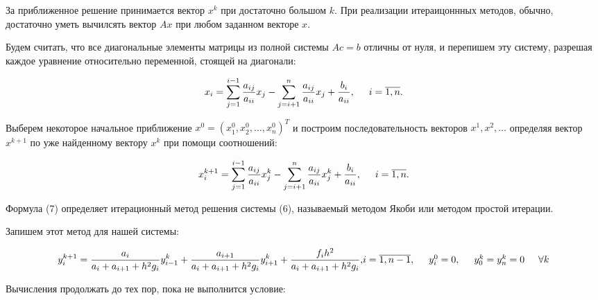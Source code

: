 \documentclass[a4paper,12pt]{article}
\begin{document}
\hspace{0.5cm} За приближенное решение принимается вектор $x^k$ при достаточно большом $k$. При реализации итераицоннных методов,
обычно, достаточно уметь вычилсять вектор $Ax$ при любом заданном векторе $x$.

\hspace{0.5cm} Будем считать, что все диагональные элементы матрицы из полной системы $Ac = b$ отличны от нуля, и перепишем
эту систему, разрешая каждое уравнение относительно переменной, стоящей на диагонали:

\begin{equation}
  x_i = \sum\limits_{j=1}^{i-1}\frac{a_{ij}}{a_{ii}} x_j - \sum\limits_{j = i+1}^{n}\frac{a_{ij}}{a_{ii}} x_j + \frac{b_i}{a_{ii}}, \hspace{0.5cm} i = \overline{1, n}.
\end{equation}

\hspace{0.5cm} Выберем некоторое начальное приближение $x^0 = (x^0_1, x^0_2, \dots, x^0_n)^T$ и построим последовательность
векторов $x^1, x^2, \dots$ определяя вектор $x^{k+1}$ по уже найденному вектору $x^k$ при помощи соотношений:

\begin{equation}
  x^{k+1}_i = \sum\limits_{j=1}^{i-1}\frac{a_{ij}}{a_{ii}} x^k_j - \sum\limits_{j = i+1}^{n}\frac{a_{ij}}{a_{ii}} x^k_j + \frac{b_i}{a_{ii}}, \hspace{0.5cm} i = \overline{1, n}.
\end{equation}

\hspace{0.5cm} Формула (7) определяет итерационный метод решения системы (6), называемый методом Якоби или методом простой итерации.

Запишем этот метод для нашей системы:

\begin{equation}
    y^{k+1}_i = \frac{a_i}{a_i + a_{i+1} + h^2 g_i} y^k_{i-1} + \frac{a_{i + 1}}{a_i + a_{i+1} + h^2 g_i} y^k_{i+1} + \frac{f_i h^2}{a_i + a_{i+1} + h^2 g_i}, $$$$
    i = \overline{1, n - 1}, \hspace{0.5cm} y^0_i = 0, \hspace{0.5cm} y^k_0 = y^k_n = 0 \hspace{0.5cm} \forall k\\
\end{equation}

Вычисления продолжать до тех пор, пока не выполнится условие:
\end{document}
